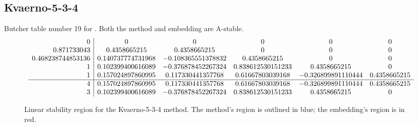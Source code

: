 \documentclass[letterpaper,10pt,english]{sphinxmanual}
\begin{document}
\subsection{Kvaerno-5-3-4}
\label{Butcher:kvaerno-5-3-4}\label{Butcher:butcher-kvaerno-5-3-4}
Butcher table number 19
for {\hyperref[c_interface/User_callable:c.ARKodeSetIRKTableNum]{\emph{}}}.  Both the
method and embedding are A-stable.
\begin{gather}
\begin{split}\begin{array}{r|ccccc}
  0 & 0 & 0 & 0 & 0 & 0 \\
  0.871733043 & 0.4358665215  & 0.4358665215  & 0 & 0 & 0 \\
  0.468238744853136 & 0.140737774731968 & -0.108365551378832 & 0.4358665215 & 0 & 0 \\
  1 & 0.102399400616089 & -0.376878452267324 & 0.838612530151233 & 0.4358665215 & 0 \\
  1 & 0.157024897860995 & 0.117330441357768 & 0.61667803039168 & -0.326899891110444 & 0.4358665215 \\
  \hline
  4 & 0.157024897860995 & 0.117330441357768 & 0.61667803039168 & -0.326899891110444 & 0.4358665215 \\
  3 & 0.102399400616089 & -0.376878452267324 & 0.838612530151233 & 0.4358665215 & 0
\end{array}\end{split}\notag
\end{gather}\begin{figure}[htbp]
\centering
\capstart

\caption{Linear stability region for the Kvaerno-5-3-4 method.  The method's
region is outlined in blue; the embedding's region is in red.}\end{figure}
\end{document}
